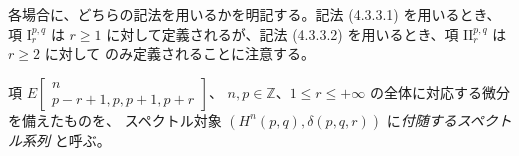 各場合に、どちらの記法を用いるかを明記する。記法 (4.3.3.1) を用いるとき、
項 $\mathrm I_r^{p,q}$ は $r\geq1$ に対して定義されるが、記法
(4.3.3.2) を用いるとき、項 $\mathrm{II}_r^{p,q}$ は $r\geq2$ に対して
のみ定義されることに注意する。

項
$E\!\left[\begin{smallmatrix}n\\p-r+1,p,p+1,p+r\end{smallmatrix}\right]$、
$n,p\in\mathbb Z$、$1\leq r\leq+\infty$ の全体に対応する微分を備えたものを、
スペクトル対象 $(H^n(p,q),\delta(p,q,r))$ に\emph{付随するスペクトル系列}
と呼ぶ。
\endgroup
